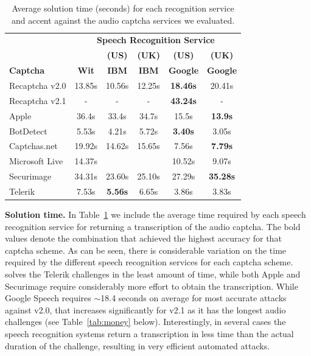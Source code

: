 \begin{table}[t]
\centering
\caption{Average solution time (seconds) for each recognition service and accent against the audio captcha services we evaluated.}
\begin{tabular}{lccccc}
\toprule
&\multicolumn{5}{c}{\textbf{Speech Recognition Service}}\\
\cmidrule{2-6}
& & \textbf{(US)} & \textbf{(UK)} & \textbf{(US)} & \textbf{(UK)} \\
\textbf{Captcha}&  \textbf{Wit} & \textbf{IBM} & \textbf{IBM} & \textbf{Google} & \textbf{Google} \\
\hline
Recaptcha v2.0 & 13.85s & 10.56s  & 12.25s & \textbf{18.46s} & 20.41s \\
\rowcolor{Gray}
Recaptcha v2.1 & -  & -  & - & \textbf{43.24s} & - \\
Apple  & 36.4s & 33.4s  & 34.7s & 15.5s & \textbf{13.9s} \\
\rowcolor{Gray}
BotDetect  & 5.53s  & 4.21s & 5.72s & \textbf{3.40s} & 3.05s \\
Captchas.net  & 19.92s  & 14.62s  & 15.65s  & 7.56s & \textbf{7.79s} \\
\rowcolor{Gray}
Microsoft Live & 14.37s  &  &  & 10.52s  & 9.07s \\
Securimage  & 34.31s & 23.60s & 25.10s  & 27.29s & \textbf{35.28s} \\
\rowcolor{Gray}
Telerik  & 7.53s & \textbf{5.56s} & 6.65s & 3.86s & 3.83s \\
\bottomrule
\end{tabular}
\label{tab:solution_time}
\end{table}

\textbf{Solution time.} In Table~\ref{tab:solution_time} we include the average time required by each speech recognition 
service for returning a transcription of the audio captcha. The bold values denote the combination that achieved the highest 
accuracy for that captcha scheme. As can be seen, there is considerable variation on the time required by the different speech 
recognition services for each captcha scheme. \system solves the Telerik challenges in the least amount of time, while both
Apple and Securimage require considerably more effort to obtain the transcription. While Google Speech requires $\sim$18.4 
seconds on average for most accurate attacks against \re v2.0, that increases significantly for v2.1 as it has the longest
audio challenges (see Table~\ref{tab:money} below). Interestingly, in several cases the speech recognition systems return
a transcription in less time than the actual duration of the challenge, resulting in very efficient automated attacks.

